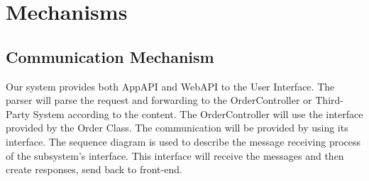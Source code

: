 \documentclass[12pt]{scrreprt}
\begin{document}
\section{Mechanisms}
\subsection{Communication Mechanism}
Our system provides both AppAPI and WebAPI to the User Interface. The parser will parse the request and forwarding to the OrderController or Third-Party System according to the content. The OrderController will use the interface provided by the Order Class. The communication will be provided by using its interface. The sequence diagram is used to describe the message receiving process of the subsystem's interface. This interface will receive the messages and then create responses, send back to front-end.
\end{document}
